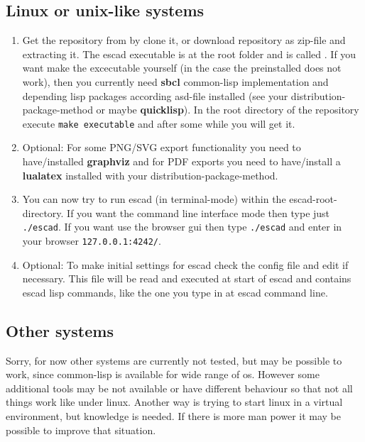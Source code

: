 \documentclass[a4paper, 12pt, openany]{scrbook}
\begin{document}
\subsection{Linux or unix-like systems}
\begin{enumerate}
\item Get the repository from  by clone it, or download repository as zip-file and extracting it. The escad executable is at the root folder and is called . If you want make the excecutable yourself (in the case the preinstalled does not work), then you currently need \textbf{sbcl} common-lisp implementation and depending lisp packages according asd-file installed (see your distribution-package-method or maybe \textbf{quicklisp}). In the root directory of the repository execute \texttt{make executable} and after some while you will get it.
\item Optional: For some PNG/SVG export functionality you need to have/installed \textbf{graphviz} and for PDF exports you need to have/install a \textbf{lualatex} installed with your distribution-package-method.
\item You can now try to run escad (in terminal-mode) within the escad-root-directory. If you want the command line interface mode then type just \texttt{./escad}. If you want use the browser gui then type \texttt{./escad} and enter in your browser \texttt{127.0.0.1:4242/}.
\item Optional: To make initial settings for escad check the config file  and edit if necessary. This file will be read and executed at start of escad and contains escad lisp commands, like the one you type in at escad command line.
\end{enumerate}
\subsection{Other systems}
Sorry, for now other systems are currently not tested, but may be possible to work, since common-lisp is available for wide range of os. However some additional tools may be not available or have different behaviour so that not all things work like under linux. Another way is trying to start linux in a virtual environment, but knowledge is needed. If there is more man power it may be possible to improve that situation.
\end{document}

